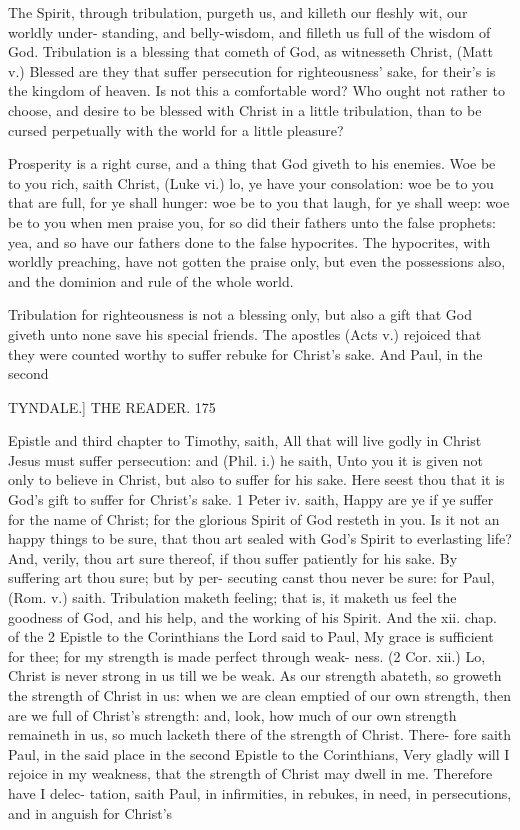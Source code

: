 \documentclass{custom}
\begin{document}
The Spirit, through tribulation, purgeth us, 
and killeth our fleshly wit, our worldly under- 
standing, and belly-wisdom, and filleth us full of 
the wisdom of God. Tribulation is a blessing 
that cometh of God, as witnesseth Christ, (Matt v.) 
Blessed are they that suffer persecution for 
righteousness' sake, for their's is the kingdom of 
heaven. Is not this a comfortable word? Who 
ought not rather to choose, and desire to be blessed 
with Christ in a little tribulation, than to be cursed 
perpetually with the world for a little pleasure? 

Prosperity is a right curse, and a thing that 
God giveth to his enemies. Woe be to you 
rich, saith Christ, (Luke vi.) lo, ye have your 
consolation: woe be to you that are full, for ye 
shall hunger: woe be to you that laugh, for ye 
shall weep: woe be to you when men praise you, 
for so did their fathers unto the false prophets: yea, 
and so have our fathers done to the false hypocrites. 
The hypocrites, with worldly preaching, have not 
gotten the praise only, but even the possessions 
also, and the dominion and rule of the whole world. 

Tribulation for righteousness is not a blessing 
only, but also a gift that God giveth unto none 
save his special friends. The apostles (Acts v.) 
rejoiced that they were counted worthy to suffer 
rebuke for Christ's sake. And Paul, in the second 


TYNDALE.] 
THE READER. 
175 


Epistle and third chapter to Timothy, saith, All 
that will live godly in Christ Jesus must suffer 
persecution: and (Phil. i.) he saith, Unto you it is 
given not only to believe in Christ, but also to suffer 
for his sake. Here seest thou that it is God's gift 
to suffer for Christ's sake. 1 Peter iv. saith, Happy 
are ye if ye suffer for the name of Christ; for the 
glorious Spirit of God resteth in you. Is it not an 
happy things to be sure, that thou art sealed with 
God's Spirit to everlasting life? And, verily, thou 
art sure thereof, if thou suffer patiently for his 
sake. By suffering art thou sure; but by per- 
secuting canst thou never be sure: for Paul, 
(Rom. v.) saith. Tribulation maketh feeling; that 
is, it maketh us feel the goodness of God, and 
his help, and the working of his Spirit. And the
xii. chap. of the 2 Epistle to the Corinthians the
Lord said to Paul, My grace is sufficient for thee;
for my strength is made perfect through weak- 
ness. (2 Cor. xii.) Lo, Christ is never strong in 
us till we be weak. As our strength abateth, so 
groweth the strength of Christ in us: when we 
are clean emptied of our own strength, then are
we full of Christ's strength: and, look, how much
of our own strength remaineth in us, so much 
lacketh there of the strength of Christ. There- 
fore saith Paul, in the said place in the second 
Epistle to the Corinthians, Very gladly will I 
rejoice in my weakness, that the strength of 
Christ may dwell in me. Therefore have I delec- 
tation, saith Paul, in infirmities, in rebukes, in 
need, in persecutions, and in anguish for Christ's 
\end{document}
